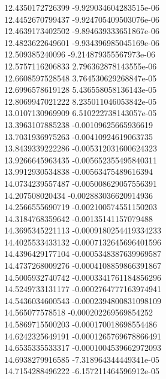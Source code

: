 {12.4350172726399 -9.929034604283515e-06 \\
12.4452670799437 -9.924705409503076e-06 \\
12.4639173402502 -9.894639333651867e-06 \\
12.4823622649601 -9.934396985045169e-06 \\
12.509385240096 -9.214879355567973e-06 \\
12.5757116206833 2.796362878143555e-06 \\
12.6608597528548 3.764530629268847e-05 \\
12.6996578619128 5.436558058136143e-05 \\
12.8069947021222 8.235011046053842e-05 \\
13.0107130969909 6.510222738143057e-05 \\
13.3963107885238 -0.00109625665936619 \\
13.7031936975263 -0.00410924619063735 \\
13.8439339222286 -0.005312031600624323 \\
13.9266645963435 -0.005652355495840311 \\
13.9912930534838 -0.00563475489616394 \\
14.0734239557487 -0.005008629057556391 \\
14.207508020434 -0.002883036620914936 \\
14.2566555690719 -0.002100574551150203 \\
14.3184768359642 -0.00135141157079488 \\
14.3695345221113 -0.0009180254419334233 \\
14.4025533433132 -0.0007132645696401596 \\
14.4396429177104 -0.0005348387639969587 \\
14.4737268009276 -0.0004108859866391867 \\
14.5005932740742 -0.0003341761184856296 \\
14.5249733131177 -0.0002764777163974941 \\
14.5436034600543 -0.0002394800831098109 \\
14.565077578518 -0.000202269569854252 \\
14.5869715500203 -0.000170018698554486 \\
14.6242325649191 -0.0001265769678866491 \\
14.6535335533317 -0.0001004539662972093 \\
14.6938279916585 -7.318964344449341e-05 \\
14.7154288496222 -6.157211464596912e-05 \\
}
